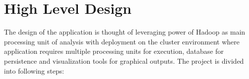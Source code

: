 \documentclass[9pt,twocolumn,twoside]{styles/osajnl}
\begin{document}
\section{High Level Design}

\begin{figure}[htbp]
\centering
{}
\label{Reference:false-color}
\end{figure}


The design of the application is thought of leveraging power of Hadoop as main processing unit of
analysis with deployment on the cluster environment where application requires multiple processing
units for execution, database for persistence and visualization tools for graphical outputs.
The project is divided into following steps:
\end{document}
